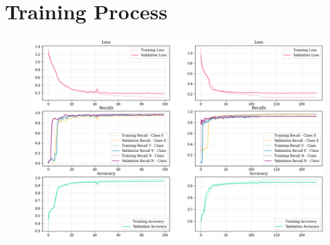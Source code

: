 \documentclass[conference]{IEEEtran}
\begin{document}
\appendices
\section{Training Process}
\begin{figure}
    \centering
    \includegraphics[width=\linewidth]{img/training.png}
    \caption{}
    \label{app:training}
\end{figure}
\end{document}
